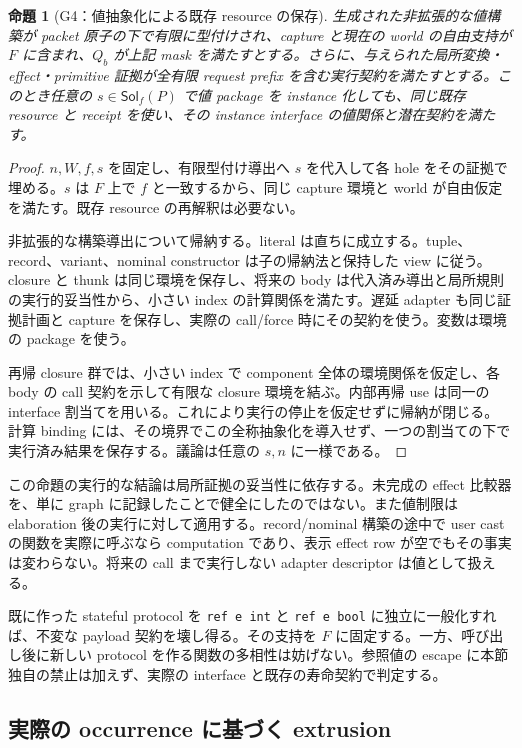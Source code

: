 \documentclass[11pt,a4paper]{article}
\newtheorem{theorem}{命題}[section]
\theoremstyle{remark}
\newcommand{\Sol}{\mathsf{Sol}}
\begin{document}
\begin{theorem}[G4：値抽象化による既存 resource の保存]
生成された非拡張的な値構築が packet 原子の下で有限に型付けされ、capture と現在の world の自由支持が $F$ に含まれ、$Q_b$ が上記 mask を満たすとする。さらに、与えられた局所変換・effect・primitive 証拠が全有限 request prefix を含む実行契約を満たすとする。このとき任意の $s\in\Sol_f(P)$ で値 package を instance 化しても、同じ既存 resource と receipt を使い、その instance interface の値関係と潜在契約を満たす。
\end{theorem}
\begin{proof}
$n,W,f,s$ を固定し、有限型付け導出へ $s$ を代入して各 hole をその証拠で埋める。$s$ は $F$ 上で $f$ と一致するから、同じ capture 環境と world が自由仮定を満たす。既存 resource の再解釈は必要ない。

非拡張的な構築導出について帰納する。literal は直ちに成立する。tuple、record、variant、nominal constructor は子の帰納法と保持した view に従う。closure と thunk は同じ環境を保存し、将来の body は代入済み導出と局所規則の実行的妥当性から、小さい index の計算関係を満たす。遅延 adapter も同じ証拠計画と capture を保存し、実際の call/force 時にその契約を使う。変数は環境の package を使う。

再帰 closure 群では、小さい index で component 全体の環境関係を仮定し、各 body の call 契約を示して有限な closure 環境を結ぶ。内部再帰 use は同一の interface 割当てを用いる。これにより実行の停止を仮定せずに帰納が閉じる。計算 binding には、その境界でこの全称抽象化を導入せず、一つの割当ての下で実行済み結果を保存する。議論は任意の $s,n$ に一様である。
\end{proof}

この命題の実行的な結論は局所証拠の妥当性に依存する。未完成の effect 比較器を、単に graph に記録したことで健全にしたのではない。また値制限は elaboration 後の実行に対して適用する。record/nominal 構築の途中で user cast の関数を実際に呼ぶなら computation であり、表示 effect row が空でもその事実は変わらない。将来の call まで実行しない adapter descriptor は値として扱える。

既に作った stateful protocol を \texttt{ref e int} と \texttt{ref e bool} に独立に一般化すれば、不変な payload 契約を壊し得る。その支持を $F$ に固定する。一方、呼び出し後に新しい protocol を作る関数の多相性は妨げない。参照値の escape に本節独自の禁止は加えず、実際の interface と既存の寿命契約で判定する。

\subsection{実際の occurrence に基づく extrusion}
\end{document}
